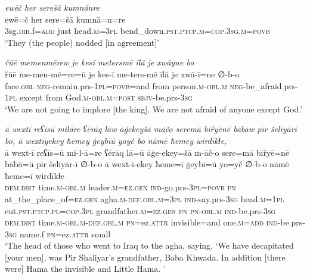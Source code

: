 \ea \label{BP.104}
\textit{ewēč her serešā kumnānre} \\ 
\gll ewē=č her sere=šā kumnā=n=re \\ 
 3sg\textsc{.dir}.f\textsc{=add} just head\textsc{.m}\textsc{=3pl} bend\_down\textsc{.pst}\textsc{.ptcp}\textsc{.m}\textsc{=cop}\textsc{.3sg}\textsc{.m}\textsc{=\textsc{povb}} \\ 
\glt `They (the people) nodded [in agreement]'
\z 
 
\ea \label{BP.118}
\textit{řūē memenmērew je kesī metersmē īlā je xwāyne bo} \\ 
\gll řūē me-men-mē=re=ū je kes-ī me-ters-mē īlā je xwā-ī=ne ∅-b-o \\ 
 face\textsc{.obl} \textsc{neg-}remain.prs\textsc{-\textsc{1pl}}\textsc{=\textsc{povb}}=and from person\textsc{.m}\textsc{-obl}\textsc{.m} \textsc{neg-}be\_afraid.prs\textsc{-\textsc{1pl}} except from God\textsc{.m}\textsc{-obl}\textsc{.m}\textsc{=\textsc{post}} \textsc{sbjv-}be.prs\textsc{-3sg} \\ 
\glt `We are not going to implore [the king]. We are not afraid of anyone except God.'
\z 
 
\ea \label{BP.122}
\textit{ā wextī reʕīsū milāre ʕērāq lāw āġekeyšā māčo seremā biřyēnē bābāw pīr šelīyārī bo, ā wextīyekey ħemey ġeybīū yoyč bo nāmē ħemey wirdīkɫe,} \\ 
\gll ā wext-ī reʕīs=ū mi-l-ā=re ʕērāq lā=ū āġe-ekey=šā m-āč-o sere=mā biřyē=nē bābā=ū pīr šelīyār-ī ∅-b-o ā wext-ī-ekey ħeme=ī ġeybī=ū yo=yč ∅-b-o nāmē ħeme=ī wirdīkɫe \\ 
 \textsc{dem.dist} time\textsc{.m}\textsc{-obl}\textsc{.m} leader\textsc{.m}\textsc{=ez.gen} \textsc{ind-}go.prs\textsc{-3pl}\textsc{=\textsc{povb}} \textsc{pn} at\_the\_place\_of\textsc{=ez.gen} agha\textsc{.m}\textsc{-def}\textsc{.obl}\textsc{.m}\textsc{=3pl} \textsc{ind-}say.prs\textsc{-3sg} head\textsc{.m}\textsc{=\textsc{1pl}} cut\textsc{.pst}\textsc{.ptcp}\textsc{.pl}\textsc{=cop}\textsc{.3pl} grandfather\textsc{.m}\textsc{=ez.gen} \textsc{pn} \textsc{pn}\textsc{-obl}\textsc{.m} \textsc{ind-}be.prs\textsc{-3sg} \textsc{dem.dist} time\textsc{.m}\textsc{-obl}\textsc{.m}\textsc{-def}\textsc{.obl}\textsc{.m} \textsc{pn}=ez.\textsc{attr} invisible=and one\textsc{.m}\textsc{=add} \textsc{ind-}be.prs\textsc{-3sg} name.f \textsc{pn}=ez.\textsc{attr} small \\ 
\glt `The head of those who went to Iraq to the agha, saying, ‘We have decapitated [your men], was Pir Shaliyar’s grandfather, Baba Khwada. In addition [there were] Hama the invisible and Little Hama. '
\z 
 
